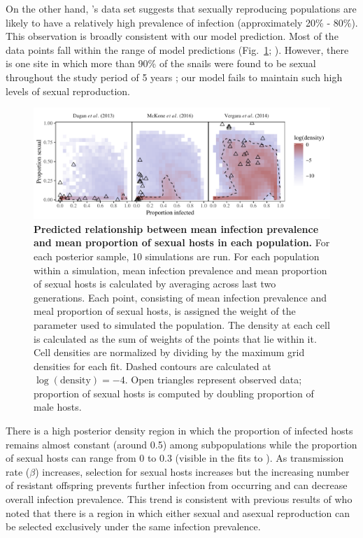 \documentclass{article}\usepackage[]{graphicx}\usepackage[]{color}
\newcommand{\citetapos}[1]{\citeauthor{#1}'s \citeyearpar{#1}}
\newcommand{\fref}[1]{Fig.~\ref{fig:#1}}
\begin{document}
On the other hand, \citetapos{vergara2014infection} data set suggests that sexually reproducing populations are likely to have a relatively high prevalence of infection (approximately 20\% - 80\%).
This observation is broadly consistent with our model prediction. 
Most of the data points fall within the range of model predictions (\fref{ivs}; \cite{vergara2014infection}).
However, there is one site in which more than 90\% of the snails were found to be sexual throughout the study period of 5 years \citep{vergara2014infection};
our model fails to maintain such high levels of sexual reproduction.

\begin{figure}[!ht]
\includegraphics[width=\textwidth]{../fig/simulated_data2.pdf}
\caption{{\bf Predicted relationship between mean infection prevalence and mean proportion of sexual hosts in each population.}
For each posterior sample, 10 simulations are run.
For each population within a simulation, mean infection prevalence and mean proportion of sexual hosts is calculated by averaging across last two generations. 
Each point, consisting of mean infection prevalence and meal proportion of sexual hosts, is assigned the weight of the parameter used to simulated the population.
The density at each cell is calculated as the sum of weights of the points that lie within it.
Cell densities are normalized by dividing by the maximum grid densities for each fit.
Dashed contours are calculated at $\log(\textrm{density}) = -4$.
Open triangles represent observed data; proportion of sexual hosts is computed by doubling proportion of male hosts.
}
\label{fig:ivs}
\end{figure}

There is a high posterior density region in which the proportion of infected hosts remains almost constant (around 0.5) among subpopulations while the proportion of sexual hosts can range from 0 to 0.3 (visible in the fits to \cite{mckone2016fine}).
As transmission rate ($\beta$) increases, selection for sexual hosts increases but the increasing number of resistant offspring prevents further infection from occurring and can decrease overall infection prevalence.
This trend is consistent with previous results of \cite{lively2001trematode} who noted that there is a region in which either sexual and asexual reproduction can be selected exclusively under the same infection prevalence.
\end{document}
